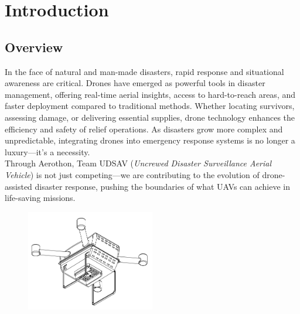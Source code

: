 \documentclass[12pt]{report}
\begin{document}
  \tableofcontents
  \newpage


  \renewcommand{\arraystretch}{1.5}

  \chapter{Introduction}
  \section{Overview}

   In the face of natural and man-made disasters, rapid response and situational awareness are critical. Drones have emerged as powerful tools in disaster management, offering real-time aerial insights, access to hard-to-reach areas, and faster deployment compared to traditional methods. Whether locating survivors, assessing damage, or delivering essential supplies, drone technology enhances the efficiency and safety of relief operations. As disasters grow more complex and unpredictable, integrating drones into emergency response systems is no longer a luxury—it's a necessity. \\ 

   Through Aerothon, Team UDSAV (\textit{Uncrewed Disaster Surveillance Aerial Vehicle}) is not just competing—we are contributing to the evolution of drone-assisted disaster response, pushing the boundaries of what UAVs can achieve in life-saving missions.
   \begin{figure}[h]
        \centering
        \includegraphics[width=0.5\textwidth]{droneschematic2d.png}
        \label{fig:udsav}
      \end{figure}
\end{document}
